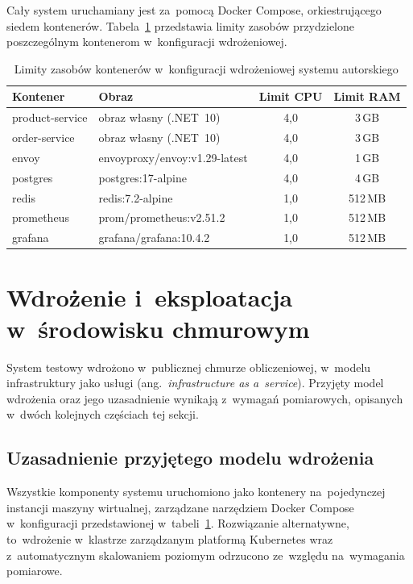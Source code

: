Cały system uruchamiany jest za~pomocą Docker Compose, orkiestrującego siedem kontenerów. Tabela~\ref{tab:DockerServices} przedstawia limity zasobów przydzielone poszczególnym kontenerom w~konfiguracji wdrożeniowej.

\begin{table}[htb]
\centering
\footnotesize
\caption{Limity zasobów kontenerów w~konfiguracji wdrożeniowej systemu autorskiego}
\label{tab:DockerServices}
\begin{tabular}{|l|l|c|c|}
\hline
\textbf{Kontener} & \textbf{Obraz} & \textbf{Limit CPU} & \textbf{Limit RAM} \\
\hline
product-service & obraz własny (.NET~10) & 4,0 & 3\,GB \\
order-service   & obraz własny (.NET~10) & 4,0 & 3\,GB \\
envoy           & envoyproxy/envoy:v1.29-latest & 4,0 & 1\,GB \\
postgres        & postgres:17-alpine & 4,0 & 4\,GB \\
redis           & redis:7.2-alpine & 1,0 & 512\,MB \\
prometheus      & prom/prometheus:v2.51.2 & 1,0 & 512\,MB \\
grafana         & grafana/grafana:10.4.2 & 1,0 & 512\,MB \\
\hline
\end{tabular}
\end{table}

\section{Wdrożenie i~eksploatacja w~środowisku chmurowym}
\label{sec:WdrozenieChmurowe}

System testowy wdrożono w~publicznej chmurze obliczeniowej, w~modelu infrastruktury jako usługi (ang.\ \textit{infrastructure as a~service}). Przyjęty model wdrożenia oraz jego uzasadnienie wynikają z~wymagań pomiarowych, opisanych w~dwóch kolejnych częściach tej sekcji.

\subsection{Uzasadnienie przyjętego modelu wdrożenia}
\label{subsec:ModelWdrozenia}

Wszystkie komponenty systemu uruchomiono jako kontenery na~pojedynczej instancji maszyny wirtualnej, zarządzane narzędziem Docker Compose w~konfiguracji przedstawionej w~tabeli~\ref{tab:DockerServices}. Rozwiązanie alternatywne, to~wdrożenie w~klastrze zarządzanym platformą Kubernetes wraz z~automatycznym skalowaniem poziomym odrzucono ze~względu na~wymagania pomiarowe.


